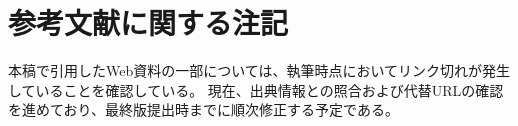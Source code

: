 \documentclass[a4paper,12pt,openany]{ltjsbook}
\renewcommand{\chaptermark}[1]{%
  \markboth{第\thechapter 章\ #1}{}%
}
\begin{document}



\frontmatter
\tableofcontents

\mainmatter













\appendix

\renewcommand{\chaptermark}[1]{%
  \markboth{#1}{}%
}









\backmatter
\section*{参考文献に関する注記} 本稿で引用したWeb資料の一部については、執筆時点においてリンク切れが発生していることを確認している。 現在、出典情報との照合および代替URLの確認を進めており、最終版提出時までに順次修正する予定である。

\printbibliography
\end{document}
